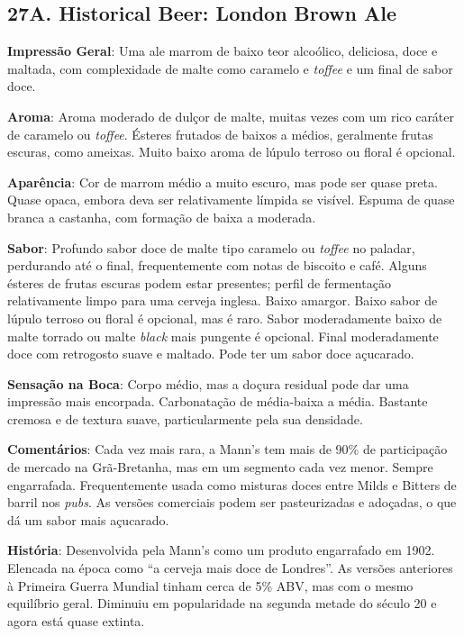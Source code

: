 \subsection*{27A. Historical Beer: London Brown Ale}
\textbf{Impressão Geral}: Uma ale marrom de baixo teor alcoólico, deliciosa, doce e maltada, com complexidade de malte como caramelo e \textit{toffee} e um final de sabor doce.

\textbf{Aroma}: Aroma moderado de dulçor de malte, muitas vezes com um rico caráter de caramelo ou \textit{toffee}. Ésteres frutados de baixos a médios, geralmente frutas escuras, como ameixas. Muito baixo aroma de lúpulo terroso ou floral é opcional.

\textbf{Aparência}: Cor de marrom médio a muito escuro, mas pode ser quase preta. Quase opaca, embora deva ser relativamente límpida se visível. Espuma de quase branca a castanha, com formação de baixa a moderada.

\textbf{Sabor}: Profundo sabor doce de malte tipo caramelo ou \textit{toffee} no paladar, perdurando até o final, frequentemente com notas de biscoito e café. Alguns ésteres de frutas escuras podem estar presentes; perfil de fermentação relativamente limpo para uma cerveja inglesa. Baixo amargor. Baixo sabor de lúpulo terroso ou floral é opcional, mas é raro. Sabor moderadamente baixo de malte torrado ou malte \textit{black} mais pungente é opcional. Final moderadamente doce com retrogosto suave e maltado. Pode ter um sabor doce açucarado.

\textbf{Sensação na Boca}: Corpo médio, mas a doçura residual pode dar uma impressão mais encorpada. Carbonatação de média-baixa a média. Bastante cremosa e de textura suave, particularmente pela sua densidade.

\textbf{Comentários}: Cada vez mais rara, a Mann's tem mais de 90\% de participação de mercado na Grã-Bretanha, mas em um segmento cada vez menor. Sempre engarrafada. Frequentemente usada como misturas doces entre Milds e Bitters de barril nos \textit{pubs}. As versões comerciais podem ser pasteurizadas e adoçadas, o que dá um sabor mais açucarado.

\textbf{História}: Desenvolvida pela Mann's como um produto engarrafado em 1902. Elencada na época como “a cerveja mais doce de Londres”. As versões anteriores à Primeira Guerra Mundial tinham cerca de 5\% ABV, mas com o mesmo equilíbrio geral. Diminuiu em popularidade na segunda metade do século 20 e agora está quase extinta.

